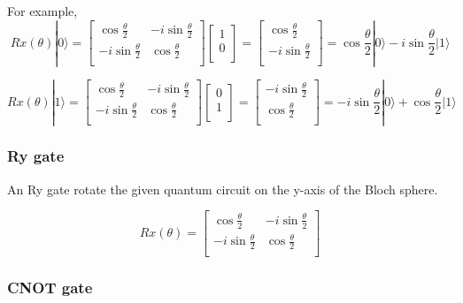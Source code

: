  For example,
$$ Rx(\theta)|0\rangle = \begin{bmatrix}
\cos{\frac{\theta}{2}} & -i\sin{\frac{\theta}{2}} \\
 -i\sin{\frac{\theta}{2}} & \cos{\frac{\theta}{2}}  \\
\end{bmatrix}\left[
\begin{array}{c}
1 \\
0 \\
\end{array}
\right]
=  \left[
\begin{array}{c}
\cos{\frac{\theta}{2}} \\
-i\sin{\frac{\theta}{2}} \\
\end{array}
\right]
= \cos{\frac{\theta}{2}}|0\rangle -i \sin{\frac{\theta}{2}} |1\rangle
$$

$$ Rx(\theta)|1\rangle = \begin{bmatrix}
\cos{\frac{\theta}{2}} & -i\sin{\frac{\theta}{2}} \\
 -i\sin{\frac{\theta}{2}} & \cos{\frac{\theta}{2}}  \\
\end{bmatrix}\left[
\begin{array}{c}
0 \\
1 \\
\end{array}
\right]
=  \left[
\begin{array}{c}
 -i\sin{\frac{\theta}{2}} \\
\cos{\frac{\theta}{2}}\\
\end{array}
\right]
=-i \sin{\frac{\theta}{2}}|0\rangle + \cos{\frac{\theta}{2}}|1\rangle
$$

\subsubsection{Ry gate}

 An Ry gate rotate the given quantum circuit on the y-axis of the Bloch sphere.
 
 $$ Rx(\theta) = \begin{bmatrix}
\cos{\frac{\theta}{2}} & -i\sin{\frac{\theta}{2}} \\
 -i\sin{\frac{\theta}{2}} & \cos{\frac{\theta}{2}}  \\
\end{bmatrix}
$$
\subsubsection{CNOT gate}

